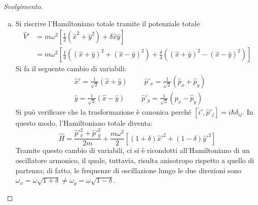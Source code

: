 \documentclass[11pt, a4paper]{scrartcl} %
\numberwithin{equation}{subsection}
\theoremstyle{style2}
\theoremstyle{style1}
\renewcommand\qedsymbol{$\blacksquare$}
\newenvironment{svolgimento}{\renewcommand\qedsymbol{$\spadesuit$}\begin{proof}[Svolgimento]}{\end{proof}}
\begin{document}
\begin{svolgimento}
\begin{enumerate}[(a).]
Per il secondo stato eccitato $E_2=3\hbar \omega$, si ha  degenerazione pari a $3$, con stati $\ket{0,2}, \ket{2,0} , \ket{1,1} $.
Il procedimento \`e analogo al precedente, solo che questa volta $\braket{\psi _i |\hat{V}|\psi _j} $ sar\`a una matrice $3\times 3$ ed \`e facile convincersi che i termini sulla diagonale sono nulli e sono nulli anche tutti quei termini in cui uno dei due stati non \`e $\ket{11} $. 
Si conclude che la matrice \`e la seguente:
\[
	M_{ij} =\frac{\delta \hbar \omega}{2}\begin{pmatrix} 0&1&0\\1&0&1\\ 0 &1  &0 \end{pmatrix} 
\] 
dove si sono ordinati gli stati nel seguente modo: $\ket{02} , \ket{11} \ket{20} $. 
Il calcolo del determinante porta, come autovalori, (sottintendendo il fattore $\delta \hbar \omega / 2$) $\lambda =0, \ \lambda _{\pm} = \pm \sqrt{2} $.
Con qualche calcolo, si trovano anche gli autostati:
\[
\ket{0} = \frac{1}{\sqrt{2} }\big(\ket{02} - \ket{20} \big) \hspace{1cm} \ket{\pm} = \frac{1}{2}\big(\ket{02} \pm \sqrt{2} \ket{11} + \ket{20} \big)
\] 
In questo caso, il livello energetico $3\hbar \omega$ si divide in tre livelli: $E_\pm = \hbar\omega (3 \pm \delta ), \ E_0 = 3\hbar \omega$.
\item  Si riscrive l'Hamiltoniano totale tramite il potenziale totale
	\[
		\begin{split}
			\hat{V}' &= m\omega^2 \left[ \frac{1}{2}\left(\hat{x}^2 + \hat{y}^2\right) + \delta \hat{x}\hat{y} \right] \\
				 &= m\omega^2 \left[ \frac{1}{4}\left(\left(\hat{x}+\hat{y}\right) ^2 + \left(\hat{x}-\hat{y}\right) ^2 \right) + \frac{\delta }{4}\left(\left(\hat{x}+\hat{y}\right) ^2 - \left(\hat{x}-\hat{y}\right) ^2\right)  \right] 
		\end{split}
	\] 
	Si fa il seguente cambio di variabili:
	\[
		\begin{split}
			&\hat{x}' = \frac{1}{\sqrt{2} }\left(\hat{x}+\hat{y}\right) \hspace{1cm} \hat{p}'_x = \frac{1}{\sqrt{2} }\left(\hat{p}_x + \hat{p}_y\right) \\
			&\hat{y} = \frac{1}{\sqrt{2 }} \left(\hat{x}-\hat{y}\right) \hspace{1cm} \hat{p}'_y = \frac{1}{\sqrt{2} }\left(\hat{p}_x - \hat{p}_y\right) 
		\end{split}
	\] 
	Si pu\`o verificare che la trasformazione \`e canonica perch\'e $[\hat{i}',\hat{p}'_j] = i\hbar \delta _{ij}  $. 
	In questo modo, l'Hamiltoniano totale diventa:
	\[
	\hat{H} = \frac{\hat{p}'^2_x + \hat{p}'^2_y}{2m}+\frac{m\omega^2}{2}\left[ (1+\delta )\hat{x}'^2 + (1-\delta ) \hat{y}'^2 \right] 
	\] 
	Tramite questo cambio di variabili, ci si \`e ricondotti all'Hamiltoniano di un oscillatore armonico, il quale, tuttavia, risulta anisotropo rispetto a quello di partenza; di fatto, le frequenze di oscillazione lungo le due direzioni sono $\omega_x = \omega \sqrt{1+\delta } \neq \omega_y  =\omega \sqrt{1 - \delta } $.


\end{enumerate}
\end{svolgimento}
\end{document}
